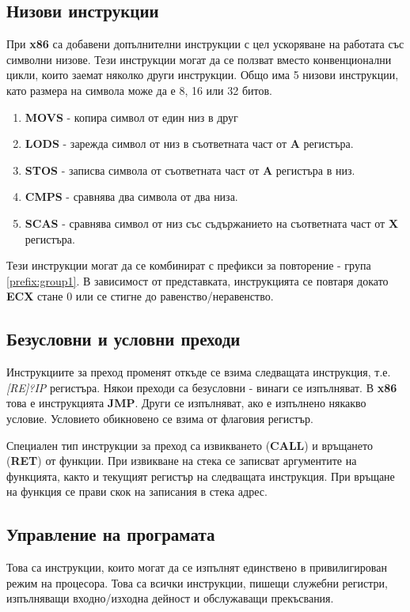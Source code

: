 \documentclass[fleqn,12pt]{article}
\begin{document}
\subsection{Низови инструкции}
При \textbf{x86} са добавени допълнителни инструкции с цел ускоряване на работата със символни низове.
Тези инструкции могат да се ползват вместо конвенционални цикли, които заемат няколко други инструкции.
Общо има 5 низови инструкции, като размера на символа може да е 8, 16 или 32 битов.
\begin{enumerate}
    \item \textbf{MOVS} - копира символ от един низ в друг
    \item \textbf{LODS} - зарежда символ от низ в съответната част от \textbf{A} регистъра.
    \item \textbf{STOS} - записва символа от съответната част от \textbf{A} регистъра в низ.
    \item \textbf{CMPS} - сравнява два символа от два низа.
    \item \textbf{SCAS} - сравнява символ от низ със съдържанието на съответната част от \textbf{X} регистъра.
\end{enumerate}

Тези инструкции могат да се комбинират с префикси за повторение - група \ref{prefix:group1}. 
В зависимост от представката, инструкцията се повтаря докато \textbf{ECX} стане 0 или се стигне
до равенство/неравенство.

\subsection{Безусловни и условни преходи}
Инструкциите за преход променят откъде се взима следващата инструкция, т.е. \textit{[RE]?IP} регистъра.
Някои преходи са безусловни - винаги се изпълняват. В \textbf{x86} това е инструкцията \textbf{JMP}.
Други се изпълняват, ако е изпълнено някакво условие. Условието обикновено се взима от флаговия регистър.

Специален тип инструкции за преход са извикването (\textbf{CALL}) и връщането (\textbf{RET}) от функции.
При извикване на стека се записват аргументите на функцията, както и текущият регистър на следващата инструкция.
При връщане на функция се прави скок на записания в стека адрес.

\subsection{Управление на програмата}
Това са инструкции, които могат да се изпълнят единствено в привилигирован режим на процесора.
Това са всички инструкции, пишещи служебни регистри, изпълняващи входно/изходна дейност и 
обслужаващи прекъсвания.
\end{document}
